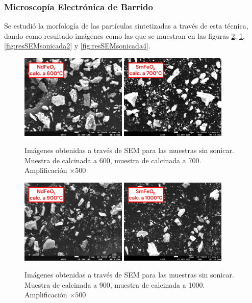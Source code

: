 \documentclass[../main.tex]{subfiles}
\begin{document}
\subsubsection{Microscopía Electrónica de Barrido}
Se estudió la morfología de las partículas sintetizadas a través de esta técnica, dando como resultado imágenes como las que se muestran en las figuras \ref{fig:resSEM900}, \ref{fig:resSEMsinsonicar}, \ref{fig:resSEMsonicada2} y \ref{fig:resSEMsonicada4}.
\begin{figure}[H]
    \centering
    \includegraphics[width=0.45\textwidth]{fig/semneod600.png}
    \quad
    \includegraphics[width=0.45\textwidth]{fig/semsama700.png}
    \caption{Imágenes obtenidas a través de SEM para las muestras sin sonicar. Muestra de \neod{} calcinada a 600\gradoC{}, muestra de \sama{} calcinada a 700\gradoC{}. Amplificación $\times500$}
    \label{fig:resSEMsinsonicar}
\end{figure}
\begin{figure}[H]
    \centering
    \includegraphics[width=0.45\textwidth]{fig/semneod900.png}
    \quad
    \includegraphics[width=0.45\textwidth]{fig/semsama1000.png}
    \caption{Imágenes obtenidas a través de SEM para las muestras sin sonicar. Muestra de \neod{} calcinada a 900\gradoC{}, muestra de \sama{} calcinada a 1000\gradoC{}. Amplificación $\times500$}
    \label{fig:resSEM900}
\end{figure}
\end{document}
